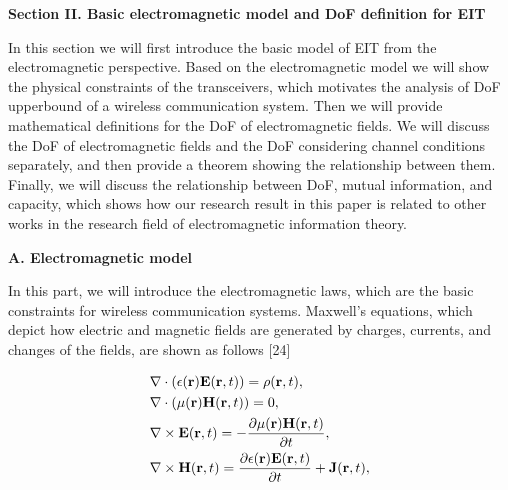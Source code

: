 \documentclass[a4paper,12pt]{article}
\begin{document}
\begin{framed}
	{\bf Section II. {\color{red} Basic electromagnetic model and DoF definition for EIT}}
	
	{\color{red} 
	\quad	In this section we will first introduce the basic model of EIT from the electromagnetic perspective. Based on the electromagnetic model we will show the physical constraints of the transceivers, which motivates the analysis of DoF upperbound of a wireless communication system. Then we will provide mathematical definitions for the DoF of electromagnetic fields. We will discuss the DoF of electromagnetic fields and the DoF considering channel conditions separately, and then provide a theorem showing the relationship between them. Finally, we will discuss the relationship between DoF, mutual information, and capacity, which shows how our research result in this paper is related to other works in the research field of electromagnetic information theory.
	}

	\setcounter{equation}{0}
	
	{\bf {\color{red}A. Electromagnetic model}}
	
	{\color{red}
	\quad In this part, we will introduce the electromagnetic laws, which are the basic constraints for wireless communication systems. Maxwell's equations, which depict how electric and magnetic fields are generated by charges, currents, and changes of the fields, are shown as follows [24]
	
	\begin{subequations}
		\begin{align} 
			& \nabla \cdot  (\epsilon({\bf r}) {\bf E}({\bf r},t)) = \rho({\bf r},t), \label{eqn_1a}\\
			& \nabla \cdot (\mu({\bf r}) {\bf H}({\bf r},t)) = 0,\\
			&\nabla \times {\bf E}({\bf r},t) = -\frac{\partial \mu({\bf r}) {\bf H}({\bf r},t)}{\partial t}, \label{eqn_1c}\\
			& \nabla \times {\bf H}({\bf r},t) = \frac{ \partial \epsilon({\bf r}) {\bf E}({\bf r},t)}{\partial t}+{\bf J}({\bf r},t) \label{eqn_1d}, 
		\end{align}
	\end{subequations}
	
}
\end{framed}
\end{document}

